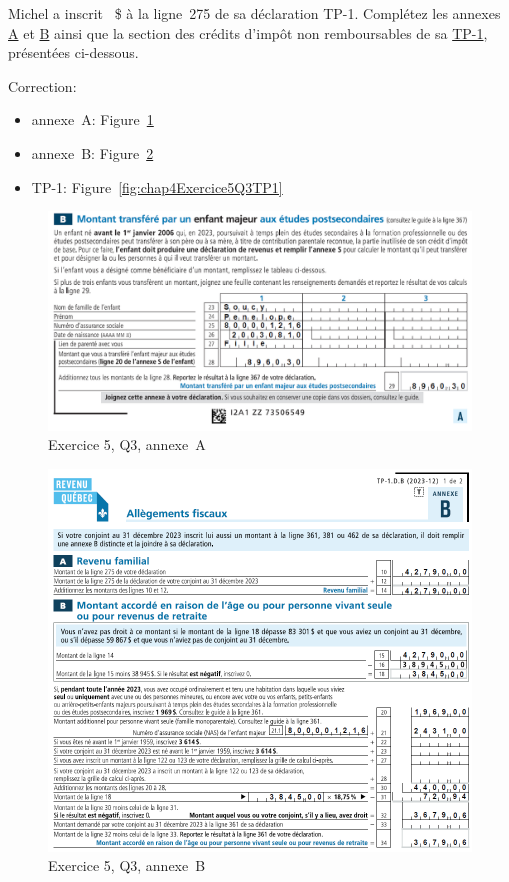 \begin{sousQuestion}
	Michel a inscrit ~\$ à la ligne~275 de sa déclaration TP-1. Complétez les annexes \href{https://www.revenuquebec.ca/documents/fr/formulaires/tp/2023-12/TP-1.D.A%282023-12%29.pdf}{A} et \href{https://www.revenuquebec.ca/documents/fr/formulaires/tp/2023-12/TP-1.D.B%282023-12%29.pdf}{B} ainsi que la section des crédits d'impôt non remboursables de sa \href{https://www.revenuquebec.ca/documents/fr/formulaires/tp/2023-12/TP-1.D%282023-12%29.pdf}{TP-1}, présentées ci-dessous.
\end{sousQuestion}
Correction:
\begin{itemize}
	\item annexe~A: Figure~\ref{fig:chap4Exercice5Q3AnnexeA}
	\item annexe~B: Figure~\ref{fig:chap4Exercice5Q3AnnexeB}
	\item TP-1: Figure~\ref{fig:chap4Exercice5Q3TP1}
\end{itemize}
\begin{figure}
	\centering
	\includegraphics[width=.9\textwidth]{exercice/4-5/Q3/Annexe-A.png}
	\caption{Exercice 5, Q3, annexe~A}
	\label{fig:chap4Exercice5Q3AnnexeA}
\end{figure}
\begin{figure}
	\centering
	\includegraphics[width=.9\textwidth]{exercice/4-5/Q3/Annexe-B.png}
	\caption{Exercice 5, Q3, annexe~B}
	\label{fig:chap4Exercice5Q3AnnexeB}
\end{figure}
